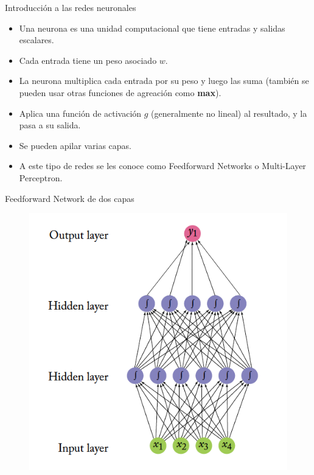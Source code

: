 \documentclass[handout]{beamer}
\begin{document}
\begin{frame}{Introducción a las redes neuronales}
\begin{scriptsize}
\begin{itemize}
\item Una neurona es una unidad computacional que tiene entradas y salidas escalares.
\item Cada entrada tiene un peso asociado $w$.
\item La neurona multiplica cada entrada por su peso y luego las suma (también se pueden usar otras funciones de agreación como \textbf{max}).
\item Aplica una función de activación $g$ (generalmente no lineal) al resultado, y la pasa a su salida.
\item Se pueden apilar varias capas.
\item A este tipo de redes se les conoce como Feedforward Networks o Multi-Layer Perceptron.
\end{itemize}


\end{scriptsize}
\end{frame}


\begin{frame}{Feedforward Network de dos capas}


\begin{figure}[htb]
	\centering
	 \includegraphics[scale=0.38]{imagenes/NN-example.png}
\end{figure}


\end{frame}
\end{document}
